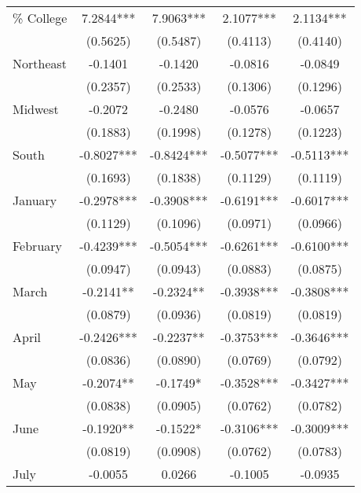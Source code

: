 \begin{table}[htbp]
\begin{tabular}{l*{4}{c}}
\% College          &      7.2844***&      7.9063***&      2.1077***&      2.1134***\\
                    &    (0.5625)   &    (0.5487)   &    (0.4113)   &    (0.4140)   \\
Northeast           &     -0.1401   &     -0.1420   &     -0.0816   &     -0.0849   \\
                    &    (0.2357)   &    (0.2533)   &    (0.1306)   &    (0.1296)   \\
Midwest             &     -0.2072   &     -0.2480   &     -0.0576   &     -0.0657   \\
                    &    (0.1883)   &    (0.1998)   &    (0.1278)   &    (0.1223)   \\
South               &     -0.8027***&     -0.8424***&     -0.5077***&     -0.5113***\\
                    &    (0.1693)   &    (0.1838)   &    (0.1129)   &    (0.1119)   \\
January             &     -0.2978***&     -0.3908***&     -0.6191***&     -0.6017***\\
                    &    (0.1129)   &    (0.1096)   &    (0.0971)   &    (0.0966)   \\
February            &     -0.4239***&     -0.5054***&     -0.6261***&     -0.6100***\\
                    &    (0.0947)   &    (0.0943)   &    (0.0883)   &    (0.0875)   \\
March               &     -0.2141** &     -0.2324** &     -0.3938***&     -0.3808***\\
                    &    (0.0879)   &    (0.0936)   &    (0.0819)   &    (0.0819)   \\
April               &     -0.2426***&     -0.2237** &     -0.3753***&     -0.3646***\\
                    &    (0.0836)   &    (0.0890)   &    (0.0769)   &    (0.0792)   \\
May                 &     -0.2074** &     -0.1749*  &     -0.3528***&     -0.3427***\\
                    &    (0.0838)   &    (0.0905)   &    (0.0762)   &    (0.0782)   \\
June                &     -0.1920** &     -0.1522*  &     -0.3106***&     -0.3009***\\
                    &    (0.0819)   &    (0.0908)   &    (0.0762)   &    (0.0783)   \\
July                &     -0.0055   &      0.0266   &     -0.1005   &     -0.0935   \\

\end{tabular}
\end{table}
